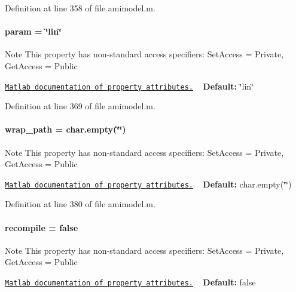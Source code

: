Definition at line 358 of file amimodel.\+m.

\hypertarget{classamimodel_a51f20d6b1b54a2eee3be0e8adc96a0ae}{}
\paragraph[{param}]{\setlength{\rightskip}{0pt plus 5cm}param = \char`\"{}lin\char`\"{}}\label{classamimodel_a51f20d6b1b54a2eee3be0e8adc96a0ae}
\begin{DoxyNote}{Note}
This property has non-\/standard access specifiers\+: {\ttfamily Set\+Access = Private, Get\+Access = Public} 

\href{http://www.mathworks.com/help/matlab/matlab_oop/property-attributes.html}{\tt Matlab documentation of property attributes.} ~\newline
{\bfseries Default\+:} \char`\"{}lin\char`\"{} 
\end{DoxyNote}


Definition at line 369 of file amimodel.\+m.

\hypertarget{classamimodel_a0b316a20054ba282555674d939a82406}{}
\paragraph[{wrap\+\_\+path}]{\setlength{\rightskip}{0pt plus 5cm}wrap\+\_\+path = char.\+empty(\char`\"{}\char`\"{})}\label{classamimodel_a0b316a20054ba282555674d939a82406}
\begin{DoxyNote}{Note}
This property has non-\/standard access specifiers\+: {\ttfamily Set\+Access = Private, Get\+Access = Public} 

\href{http://www.mathworks.com/help/matlab/matlab_oop/property-attributes.html}{\tt Matlab documentation of property attributes.} ~\newline
{\bfseries Default\+:} char.\+empty(\char`\"{}\char`\"{}) 
\end{DoxyNote}


Definition at line 380 of file amimodel.\+m.

\hypertarget{classamimodel_a8d2e824e03e32034b634a7c48f2a26c6}{}
\paragraph[{recompile}]{\setlength{\rightskip}{0pt plus 5cm}recompile = false}\label{classamimodel_a8d2e824e03e32034b634a7c48f2a26c6}
\begin{DoxyNote}{Note}
This property has non-\/standard access specifiers\+: {\ttfamily Set\+Access = Private, Get\+Access = Public} 

\href{http://www.mathworks.com/help/matlab/matlab_oop/property-attributes.html}{\tt Matlab documentation of property attributes.} ~\newline
{\bfseries Default\+:} false 
\end{DoxyNote}


